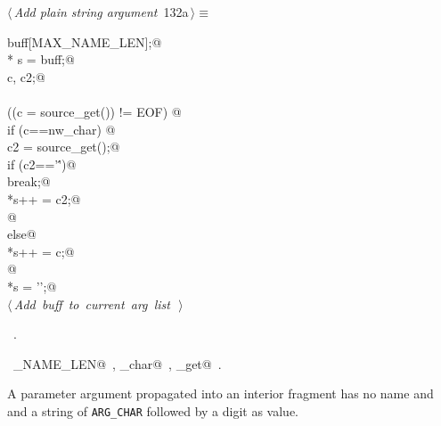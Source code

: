 \documentclass[a4paper]{report}
\begin{document}
\begin{flushleft} \small
\begin{minipage}{\linewidth}\label{scrap280}\raggedright\small
{} $\langle\,${\it Add plain string argument}\nobreak\ {\footnotesize {132a}}$\,\rangle\equiv$
\vspace{-1ex}
\begin{list}{}{} \item
\mbox{}\verb@char buff[MAX_NAME_LEN];@\\
\mbox{}\verb@char * s = buff;@\\
\mbox{}\verb@int c, c2;@\\
\mbox{}\verb@@\\
\mbox{}\verb@while ((c = source_get()) != EOF) {@\\
\mbox{}\verb@  if (c==nw_char) {@\\
\mbox{}\verb@    c2 = source_get();@\\
\mbox{}\verb@    if (c2=='\'')@\\
\mbox{}\verb@      break;@\\
\mbox{}\verb@    *s++ = c2;@\\
\mbox{}\verb@  }@\\
\mbox{}\verb@  else@\\
\mbox{}\verb@    *s++ = c;@\\
\mbox{}\verb@}@\\
\mbox{}\verb@*s = '';@\\
\mbox{}\verb@@\hbox{$\langle\,${\it Add buff to current arg list}\nobreak\ {\footnotesize {}}$\,\rangle$}\verb@@{\NWsep}
\end{list}
\vspace{-1.5ex}
\footnotesize
\begin{list}{}{\setlength{\itemsep}{-\parsep}\setlength{\itemindent}{-\leftmargin}}
\item \NWtxtMacroRefIn\ .
\item \NWtxtIdentsUsed\nobreak\  \verb@MAX_NAME_LEN@\nobreak\ , \verb@nw_char@\nobreak\ , \verb@source_get@\nobreak\ .
\item{}
\end{list}
\end{minipage}\vspace{4ex}
\end{flushleft}
A parameter argument propagated into an interior fragment has no name
and and a string of \verb|ARG_CHAR| followed by a digit as value.
\end{document}
